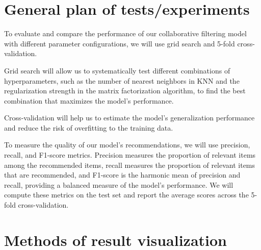 \documentclass[12pt]{article}
\begin{document}
\section{General plan of tests/experiments}

To evaluate and compare the performance of our collaborative filtering model with different parameter configurations, we will use grid search and 5-fold cross-validation.

Grid search will allow us to systematically test different combinations of hyperparameters, such as the number of nearest neighbors in KNN and the regularization strength in the matrix factorization algorithm, to find the best combination that maximizes the model's performance.

Cross-validation will help us to estimate the model's generalization performance and reduce the risk of overfitting to the training data.

To measure the quality of our model's recommendations, we will use precision, recall, and F1-score metrics. Precision measures the proportion of relevant items among the recommended items, recall measures the proportion of relevant items that are recommended, and F1-score is the harmonic mean of precision and recall, providing a balanced measure of the model's performance. We will compute these metrics on the test set and report the average scores across the 5-fold cross-validation.


\section{Methods of result visualization}
\end{document}
